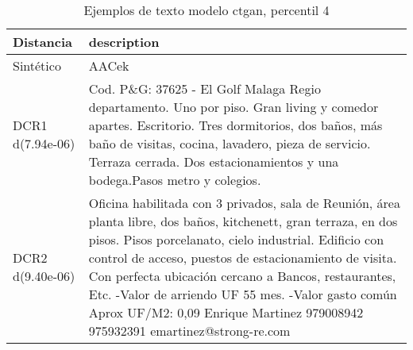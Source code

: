 \begin{table}[H]
\centering
\fontsize{10}{14}\selectfont
\caption{Ejemplos de texto modelo ctgan, percentil 4}
\label{table-example-economicos-a-3-ctgan-4p-text}
\begin{tabular}{|l|m{35em}|}
\hline
\rowcolor[gray]{0.8}
Distancia & description \\
\hline Sintético & AACek \\
\hline DCR1 d(7.94e-06) & Cod. P\&G: 37625 - El Golf Malaga Regio departamento. Uno por piso. Gran living y comedor apartes. Escritorio. Tres dormitorios, dos ba\~nos, m\'as ba\~no de visitas, cocina, lavadero, pieza de servicio. Terraza cerrada. Dos estacionamientos y una bodega.Pasos metro y colegios. \\
\hline DCR2 d(9.40e-06) & Oficina habilitada con 3 privados, sala de Reuni\'on, \'area planta libre, dos ba\~nos, kitchenett, gran terraza, en dos pisos. Pisos porcelanato, cielo industrial. Edificio con control de acceso, puestos de estacionamiento de visita. Con perfecta ubicaci\'on cercano a Bancos, restaurantes, Etc.  -Valor de arriendo UF 55 mes. -Valor gasto com\'un Aprox UF/M2: 0,09  Enrique Martinez 979008942 975932391 emartinez@strong-re.com \\
\hline
\end{tabular}
\end{table}
